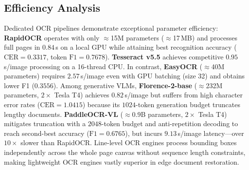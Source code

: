 \subsection{Efficiency Analysis}
Dedicated OCR pipelines demonstrate exceptional parameter efficiency: \textbf{RapidOCR} operates with only $\approx$15M parameters ($\approx$17\,MB) and processes full pages in $0.84$\,s on a local GPU while attaining best recognition accuracy ($\text{CER}=0.3317$, token $\text{F1}=0.7678$). \textbf{Tesseract v5.5} achieves competitive $0.95$\,s/image processing on a 16-thread CPU. In contrast, \textbf{EasyOCR} ($\approx$40M parameters) requires $2.57$\,s/image even with GPU batching (size 32) and obtains lower F1 ($0.3556$). Among generative VLMs, \textbf{Florence-2-base} ($\approx$232M parameters, $2\times$ Tesla T4) achieves $0.82$\,s/image but suffers from high character error rates ($\text{CER}=1.0415$) because its $1024$-token generation budget truncates lengthy documents. \textbf{PaddleOCR-VL} ($\approx$0.9B parameters, $2\times$ Tesla T4) mitigates truncation with a $2048$-token budget and anti-repetition decoding to reach second-best accuracy ($\text{F1}=0.6765$), but incurs $9.13$\,s/image latency---over $10\times$ slower than RapidOCR. Line-level OCR engines process bounding boxes independently across the whole page canvas without sequence length constraints, making lightweight OCR engines vastly superior in edge document restoration.
